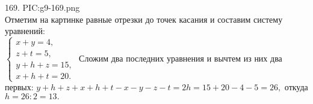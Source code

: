 169. {{PIC:g9-169.png}}\\
Отметим на картинке равные отрезки до точек касания и составим систему уравнений:\\ $\begin{cases}x+y=4,\\ z+t=5,\\ y+h+z=15,\\ x+h+t=20.\end{cases}$ Сложим два последних уравнения и вычтем из них два первых: $y+h+z+x+h+t-x-y-z-t=2h=15+20-4-5=26,$ откуда $h=26:2=13.$\\
